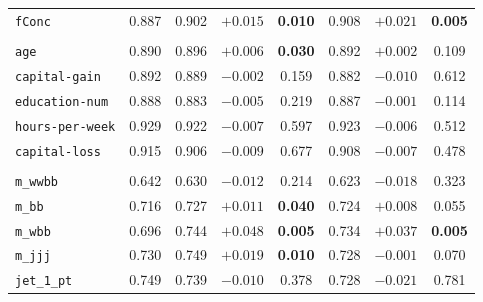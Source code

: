 \begin{table}[htbp]
\begin{tabular}{@{}l c ccc ccc@{}}
\texttt{fConc} & 0.887 & 0.902 & $\mathbf{+0.015}$ & \textbf{0.010} & 0.908 & $\mathbf{+0.021}$ & \textbf{0.005} \\
\addlinespace[3pt]
\multicolumn{8}{@{}l}{\textit{Adult}} \\
\texttt{age} & 0.890 & 0.896 & $\mathbf{+0.006}$ & \textbf{0.030} & 0.892 & $+0.002$ & 0.109 \\
\texttt{capital-gain} & 0.892 & 0.889 & $-0.002$ & 0.159 & 0.882 & $-0.010$ & 0.612 \\
\texttt{education-num} & 0.888 & 0.883 & $-0.005$ & 0.219 & 0.887 & $-0.001$ & 0.114 \\
\texttt{hours-per-week} & 0.929 & 0.922 & $-0.007$ & 0.597 & 0.923 & $-0.006$ & 0.512 \\
\texttt{capital-loss} & 0.915 & 0.906 & $-0.009$ & 0.677 & 0.908 & $-0.007$ & 0.478 \\
\addlinespace[3pt]
\multicolumn{8}{@{}l}{\textit{HIGGS}} \\
\texttt{m\_wwbb} & 0.642 & 0.630 & $-0.012$ & 0.214 & 0.623 & $-0.018$ & 0.323 \\
\texttt{m\_bb} & 0.716 & 0.727 & $\mathbf{+0.011}$ & \textbf{0.040} & 0.724 & $+0.008$ & 0.055 \\
\texttt{m\_wbb} & 0.696 & 0.744 & $\mathbf{+0.048}$ & \textbf{0.005} & 0.734 & $\mathbf{+0.037}$ & \textbf{0.005} \\
\texttt{m\_jjj} & 0.730 & 0.749 & $\mathbf{+0.019}$ & \textbf{0.010} & 0.728 & $-0.001$ & 0.070 \\
\texttt{jet\_1\_pt} & 0.749 & 0.739 & $-0.010$ & 0.378 & 0.728 & $-0.021$ & 0.781 \\
\bottomrule
\end{tabular}
\end{table}
